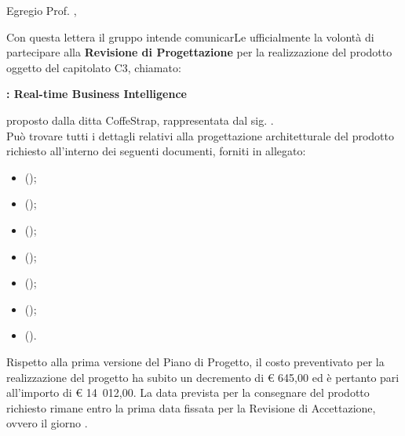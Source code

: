 \documentclass{letter}
\begin{document}
\begin{letter}{}

	\vspace{4cm}
	
	\opening{Egregio Prof. \committente{},}
	
	Con questa lettera il gruppo \groupname{} intende comunicarLe ufficialmente la volontà di partecipare alla \textbf{Revisione di Progettazione} per la realizzazione del prodotto oggetto del capitolato C3, chiamato:
	\begin{center}
		\textbf{\projectname{}: Real-time Business Intelligence}
	\end{center}
	proposto dalla ditta CoffeStrap, rappresentata dal sig. \proponente{}.\\
	Può trovare tutti i dettagli relativi alla progettazione architetturale del prodotto richiesto all'interno dei seguenti documenti, forniti in allegato:

	\begin{itemize}
		\item {} ();
		\item {} ();
		\item {} ();
		\item {} ();
		\item {} ();
		\item {} ();
		\item {} ().
	\end{itemize}
	Rispetto alla prima versione del Piano di Progetto, il costo preventivato per la realizzazione del progetto ha subito un decremento di \euro{} 645,00 ed è pertanto pari all'importo di \euro{} 14~012,00. La data prevista per la consegnare del prodotto richiesto rimane entro la prima data fissata per la Revisione di Accettazione, ovvero il giorno .


\end{letter}
\end{document}
